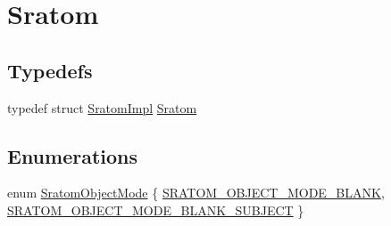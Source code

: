 \hypertarget{group__sratom}{}\section{Sratom}
\label{group__sratom}
\subsection*{Typedefs}
\begin{DoxyCompactItemize}
\item 
typedef struct \hyperlink{struct_sratom_impl}{Sratom\+Impl} \hyperlink{group__sratom_gaff6a49d547dbfe9f8d910f9b1ae98494}{Sratom}
\end{DoxyCompactItemize}
\subsection*{Enumerations}
\begin{DoxyCompactItemize}
\item 
enum \hyperlink{group__sratom_gaf476c91b166a55d78e4aa7fc2213182f}{Sratom\+Object\+Mode} \{ \hyperlink{group__sratom_ggaf476c91b166a55d78e4aa7fc2213182fa7f47b603d2cd7da31469a0dce3828739}{S\+R\+A\+T\+O\+M\+\_\+\+O\+B\+J\+E\+C\+T\+\_\+\+M\+O\+D\+E\+\_\+\+B\+L\+A\+NK}, 
\hyperlink{group__sratom_ggaf476c91b166a55d78e4aa7fc2213182fa50e9f133f13abf4063480d1f546b854c}{S\+R\+A\+T\+O\+M\+\_\+\+O\+B\+J\+E\+C\+T\+\_\+\+M\+O\+D\+E\+\_\+\+B\+L\+A\+N\+K\+\_\+\+S\+U\+B\+J\+E\+CT}
 \}
\end{DoxyCompactItemize}
